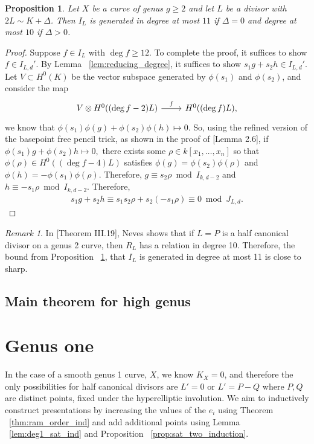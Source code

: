 \documentclass{amsart}
\theoremstyle{plain}
\newtheorem{prop}[thm]{Proposition}
\theoremstyle{definition}
\theoremstyle{remark}
\newtheorem{rem}[thm]{Remark}
\numberwithin{equation}{section}
\newcommand\ssec{\subsection}
\newcommand \halfcan{L}
\begin{document}
\begin{prop}
\label{prop:relations_generation}
Let $X$ be a curve of genus $g \geq 2$ and let $L$ be a divisor with $2L \sim K + \Delta$. Then $I_L$ is generated in degree at most $11$ if $\Delta = 0$ and degree at most $10$ if $\Delta > 0$.
\end{prop}
\begin{proof}
Suppose $f \in I_L$ with $\deg f \geq 12$. To complete the proof, it suffices to show $f \in I_{L,d}'$. By Lemma ~\ref{lem:reducing_degree}, it suffices to show $s_1g+s_2h \in I_{L,d}'$. 
Let $V \subset H^0(K)$ be the vector subspace generated by $\phi(s_1)$ and $\phi(s_2)$, and consider the map
$$\begin{tikzcd}
V \otimes H^0((\deg f - 2)L) \ar {r}{f} & H^0((\deg f)L),
\end{tikzcd}$$
we know that $\phi(s_1)\phi(g) + \phi(s_2) \phi(h) \mapsto 0.$
So, using the refined version of the basepoint free pencil trick, as shown in the proof of \cite{saint-donat:proj}[Lemma 2.6], if $\phi(s_1) g + \phi(s_2)h \mapsto 0,$ there exists some $\rho \in k[x_1, \ldots, x_n]$ so that $\phi(\rho) \in H^0((\deg f - 4)L)$ satisfies $\phi(g) = \phi(s_2)\phi(\rho)$ and $\phi(h) = -\phi(s_1)\phi(\rho).$ Therefore, $g \equiv s_2 \rho \bmod I_{k,d-2}$ and $h \equiv -s_1 \rho \bmod I_{k,d-2}$. Therefore,
\begin{align*}
	s_1g + s_2h \equiv s_1s_2\rho + s_2(-s_1 \rho) \equiv 0 \bmod J_{L,d}.
\end{align*}
\end{proof}

\begin{rem}
\label{rem:relations_generation_ten}
In \cite{neves:halfcan}[Theorem III.19], Neves shows that if $L=P$ is a half canonical divisor on a genus 2 curve, then $R_L$ has a relation in degree 10. Therefore, the bound from Proposition ~\ref{prop:relations_generation}, that $I_L$ is generated in degree at most 11 is close to sharp.
\end{rem}



\ssec{Main theorem for high genus}
\label{ssec:main_g_high}



\section{Genus one}
\label{sec:g_1}

In the case of a smooth genus 1 curve, $X$, we know $K_X = 0$, and therefore the only possibilities for half canonical divisors are $\halfcan' = 0$ or $\halfcan' = P-Q$ where $P,Q$ are distinct points, fixed under the hyperelliptic involution. We aim to inductively construct presentations by increasing the values of the $e_i$ using Theorem ~\ref{thm:ram_order_ind} and add additional points using Lemma ~\ref{lem:deg1_sat_ind} and Proposition ~\ref{prop:sat_two_induction}.
\end{document}
